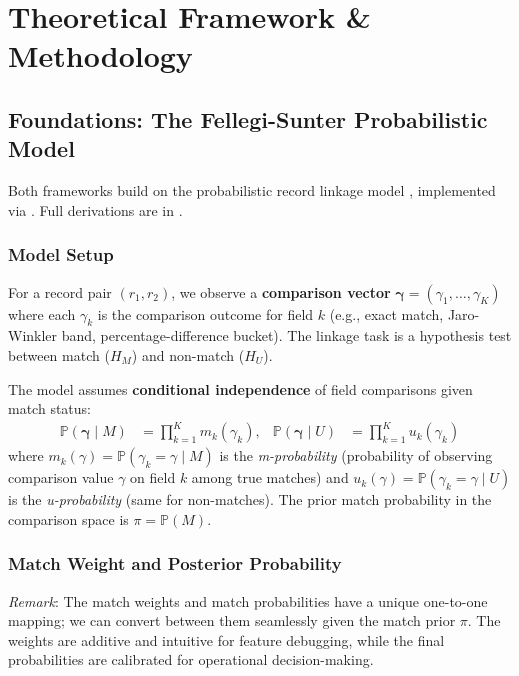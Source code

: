 \section{Theoretical Framework \& Methodology}
\label{sec:framework}

\subsection{Foundations: The Fellegi-Sunter Probabilistic Model}
\label{sec:fs_foundations}

Both frameworks build on the \fellegisunter{} probabilistic record linkage model \cite{fellegi1969theory}, implemented via \splink{} \cite{splink2024}. Full derivations are in .

\subsubsection{Model Setup}
For a record pair $(r_1, r_2)$, we observe a \textbf{comparison vector} $\boldsymbol{\gamma} = (\gamma_1, \dots, \gamma_K)$ where each $\gamma_k$ is the comparison outcome for field $k$ (e.g., exact match, Jaro-Winkler band, percentage-difference bucket). The linkage task is a hypothesis test between match ($H_M$) and non-match ($H_U$).

The model assumes \textbf{conditional independence} of field comparisons given match status:
\begin{align}
	\mathbb{P}(\boldsymbol{\gamma} \mid M) & = \prod_{k=1}^K m_k(\gamma_k), &
	\mathbb{P}(\boldsymbol{\gamma} \mid U) & = \prod_{k=1}^K u_k(\gamma_k)
\end{align}
where $m_k(\gamma) = \mathbb{P}(\gamma_k = \gamma \mid M)$ is the \textit{m-probability} (probability of observing comparison value $\gamma$ on field $k$ among true matches) and $u_k(\gamma) = \mathbb{P}(\gamma_k = \gamma \mid U)$ is the \textit{u-probability} (same for non-matches). The prior match probability in the comparison space is $\pi = \mathbb{P}(M)$.

\subsubsection{Match Weight and Posterior Probability}
\textit{Remark}: The match weights and match probabilities have a unique one-to-one mapping; we can convert between them seamlessly given the match prior $\pi$. The weights are additive and intuitive for feature debugging, while the final probabilities are calibrated for operational decision-making. \citep{winkler1993improved}

